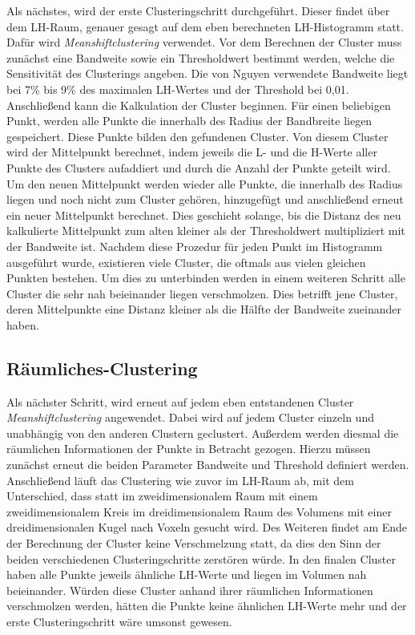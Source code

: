 Als nächstes, wird der erste Clusteringschritt durchgeführt. Dieser findet über dem LH-Raum, genauer gesagt auf dem eben berechneten LH-Histogramm statt. Dafür wird \textit{Meanshiftclustering} verwendet.
\newline
Vor dem Berechnen der Cluster muss zunächst eine Bandweite sowie ein Thresholdwert bestimmt werden, welche die Sensitivität des Clusterings angeben. Die von Nguyen \cite{nguyen2012clustering} verwendete Bandweite liegt bei 7\% bis 9\% des maximalen LH-Wertes und der Threshold bei 0,01. Anschließend kann die Kalkulation der Cluster beginnen.
\newline
Für einen beliebigen Punkt, werden alle Punkte die innerhalb des Radius der Bandbreite liegen gespeichert. Diese Punkte bilden den gefundenen Cluster. Von diesem Cluster wird der Mittelpunkt berechnet, indem jeweils die L- und die H-Werte aller Punkte des Clusters aufaddiert und durch die Anzahl der Punkte geteilt wird. Um den neuen Mittelpunkt werden wieder alle Punkte, die innerhalb des Radius liegen und noch nicht zum Cluster gehören, hinzugefügt und anschließend erneut ein neuer Mittelpunkt berechnet. Dies geschieht solange, bis die Distanz des neu kalkulierte Mittelpunkt zum alten kleiner als der Thresholdwert multipliziert mit der Bandweite ist. 
\newline
Nachdem diese Prozedur für jeden Punkt im Histogramm ausgeführt wurde, existieren viele Cluster, die oftmals aus vielen gleichen Punkten bestehen. Um dies zu unterbinden werden in einem weiteren Schritt alle Cluster die sehr nah beieinander liegen verschmolzen. Dies betrifft jene Cluster, deren Mittelpunkte eine Distanz kleiner als die Hälfte der Bandweite zueinander haben.



\subsection{Räumliches-Clustering}

Als nächster Schritt, wird erneut auf jedem eben entstandenen Cluster \textit{Meanshiftclustering} angewendet. Dabei wird auf jedem Cluster einzeln und unabhängig von den anderen Clustern geclustert. Außerdem werden diesmal die räumlichen Informationen der Punkte in Betracht gezogen. Hierzu müssen zunächst erneut die beiden Parameter Bandweite und Threshold definiert werden.
\newline
Anschließend läuft das Clustering wie zuvor im LH-Raum ab, mit dem Unterschied, dass statt im zweidimensionalem Raum mit einem zweidimensionalem Kreis im dreidimensionalem Raum des Volumens mit einer dreidimensionalen Kugel nach Voxeln gesucht wird.
\newline
Des Weiteren findet am Ende der Berechnung der Cluster keine Verschmelzung statt, da dies den Sinn der beiden verschiedenen Clusteringschritte zerstören würde. In den finalen Cluster haben alle Punkte jeweils ähnliche LH-Werte und liegen im Volumen nah beieinander.
\newline
Würden diese Cluster anhand ihrer räumlichen Informationen verschmolzen werden, hätten die Punkte keine ähnlichen LH-Werte mehr und der erste Clusteringschritt wäre umsonst gewesen.



